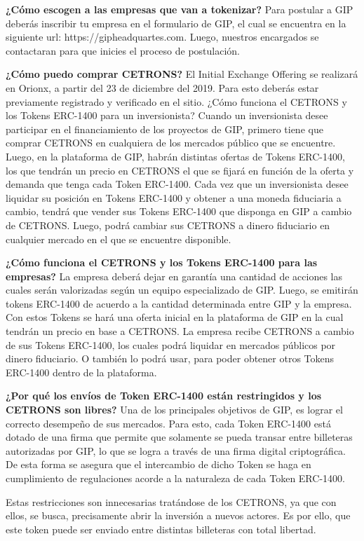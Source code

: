 \textbf{¿Cómo escogen a las empresas que van a tokenizar? }
\vspace{2mm}
\newline
Para postular a GIP deberás inscribir tu empresa en el formulario de GIP, el cual se  encuentra en la siguiente url:  https://gipheadquartes.com. Luego, nuestros encargados se  contactaran para que inicies el proceso de postulación.

\noindent
\vspace{4mm}
\newline
\textbf{¿Cómo puedo comprar CETRONS?}
\vspace{2mm}
\newline
El Initial Exchange Offering se realizará en Orionx, a partir del 23 de diciembre  del 2019. Para esto deberás estar previamente registrado y verificado en el sitio.
¿Cómo funciona el CETRONS y los Tokens ERC-1400 para un inversionista?
Cuando un inversionista desee participar en el financiamiento de los proyectos de GIP, primero tiene que comprar CETRONS en cualquiera de los mercados público que se encuentre. 
Luego, en la plataforma de GIP, habrán distintas ofertas de Tokens ERC-1400, los que tendrán un precio en CETRONS el que se fijará en función de la oferta y demanda que tenga cada Token ERC-1400. 
Cada  vez que un inversionista desee liquidar su posición en Tokens ERC-1400 y obtener a una moneda fiduciaria a cambio, tendrá que vender sus Tokens ERC-1400 que disponga en GIP a cambio de CETRONS. Luego, podrá cambiar  sus CETRONS  a dinero fiduciario en cualquier mercado en el que se encuentre disponible.

\noindent
\vspace{4mm}
\newline
\textbf{¿Cómo funciona el CETRONS y los Tokens ERC-1400 para las empresas?}
\vspace{2mm}
\newline
La empresa deberá dejar en garantía una cantidad de acciones las cuales serán valorizadas según un equipo especializado de GIP. 
Luego, se emitirán tokens ERC-1400 de acuerdo a la cantidad determinada entre GIP y la empresa. Con estos Tokens se hará una oferta inicial en la plataforma de GIP en la cual tendrán un precio en base a CETRONS.
La empresa recibe CETRONS a cambio de sus Tokens ERC-1400, los cuales podrá liquidar en mercados públicos por dinero fiduciario. O también lo podrá usar, para poder obtener otros Tokens ERC-1400 dentro de la plataforma.

\noindent
\vspace{4mm}
\newline
\textbf{¿Por qué los envíos de Token ERC-1400 están restringidos y los CETRONS son libres?}
\vspace{2mm}
\newline
Una de los principales objetivos de GIP, es lograr el correcto desempeño de sus mercados.  Para esto, cada Token ERC-1400 está dotado de una firma que permite que solamente se pueda transar entre billeteras autorizadas por GIP, lo que se logra a través de una firma digital criptográfica. De esta forma se asegura que el intercambio de dicho Token se haga en cumplimiento de regulaciones acorde a la naturaleza de cada Token ERC-1400.

Estas restricciones son innecesarias tratándose de los CETRONS, ya que con ellos, se busca, precisamente abrir la inversión a nuevos actores. Es por ello, que este token puede ser enviado entre distintas billeteras con total libertad. 

